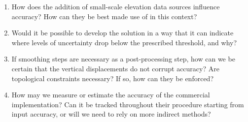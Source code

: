 \begin{enumerate}
\begin{enumerate}
        \item How does the addition of small-scale elevation data sources influence accuracy? How can they be best made use of in this context?
        \item Would it be possible to develop the solution in a way that it can indicate where levels of uncertainty drop below the prescribed threshold, and why?
        \item If smoothing steps are necessary as a post-processing step, how can we be certain that the vertical displacements do not corrupt accuracy? Are topological constraints necessary? If so, how can they be enforced?
        \item How may we measure or estimate the accuracy of the commercial implementation? Can it be tracked throughout their procedure starting from input accuracy, or will we need to rely on more indirect methods?
    \end{enumerate}
\end{enumerate}